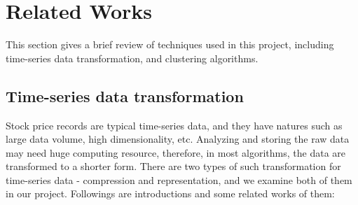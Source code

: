 \section{Related Works}
This section gives a brief review of techniques used in this project, including time-series data transformation, and clustering algorithms. 

\subsection{Time-series data transformation}
\label{sec:compression1}
Stock price records are typical time-series data, and they have natures such as large data volume, high dimensionality, etc. Analyzing  and storing the raw data may need huge computing resource, therefore, in most algorithms, the data are transformed to a shorter form. There are two types of such transformation for time-series data - compression and representation, and we examine both of them in our project. Followings are introductions and some related works of them:
